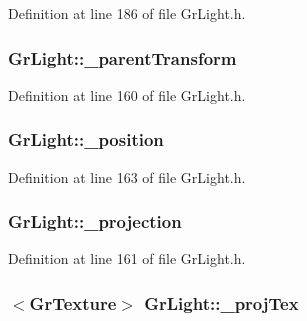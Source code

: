 Definition at line 186 of file GrLight.h.\hypertarget{class_gr_light_abd86e7a88a4b1ad492f7042ccdf634b}{
\subsubsection[{\_\-parentTransform}]{ {\bf GrLight::\_\-parentTransform}}}
\label{class_gr_light_abd86e7a88a4b1ad492f7042ccdf634b}




Definition at line 160 of file GrLight.h.\hypertarget{class_gr_light_e3d31e4913c06cc34f2ea5ab47937ca2}{
\subsubsection[{\_\-position}]{ {\bf GrLight::\_\-position}}}
\label{class_gr_light_e3d31e4913c06cc34f2ea5ab47937ca2}




Definition at line 163 of file GrLight.h.\hypertarget{class_gr_light_a9c699d4b6090dc95a332abb6c6f525e}{
\subsubsection[{\_\-projection}]{ {\bf GrLight::\_\-projection}}}
\label{class_gr_light_a9c699d4b6090dc95a332abb6c6f525e}




Definition at line 161 of file GrLight.h.\hypertarget{class_gr_light_214aad662401b11c0d967dffd7c913dc}{
\subsubsection[{\_\-projTex}]{$<${\bf GrTexture}$>$ {\bf GrLight::\_\-projTex}}}
\label{class_gr_light_214aad662401b11c0d967dffd7c913dc}




